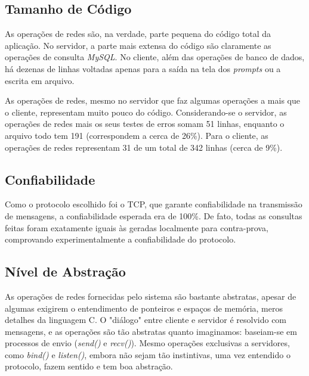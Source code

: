 \documentclass[12pt,a4paper]{article}
\begin{document}

\subsection{Tamanho de Código}
As operações de redes são, na verdade, parte pequena do código total da aplicação. No servidor, a parte mais extensa do código são claramente as operações de consulta {\it MySQL}. No cliente, além das operações de banco de dados, há dezenas de linhas voltadas apenas para a saída na tela dos {\it prompts} ou a escrita em arquivo.

As operações de redes, mesmo no servidor que faz algumas operações a mais que o cliente, representam muito pouco do código. Considerando-se o servidor, as operações de redes mais os seus testes de erros somam 51 linhas, enquanto o arquivo todo tem 191 (correspondem a cerca de 26\%). Para o cliente, as operações de redes representam 31 de um total de 342 linhas (cerca de 9\%). 

\subsection{Confiabilidade}

Como o protocolo escolhido foi o TCP, que garante confiabilidade na transmissão de mensagens, a confiabilidade esperada era de 100\%. De fato, todas as consultas feitas foram exatamente iguais às geradas localmente para contra-prova, comprovando experimentalmente a confiabilidade do protocolo.

\subsection{Nível de Abstração}

As operações de redes fornecidas pelo sistema são bastante abstratas, apesar de algumas exigirem o entendimento de ponteiros e espaços de memória, meros detalhes da linguagem C. O "diálogo" entre cliente e servidor é resolvido com mensagens, e as operações são tão abstratas quanto imaginamos: baseiam-se em processos de envio ({\it send()} e {\it recv()}). Mesmo operações exclusivas a servidores, como {\it bind()} e {\it listen()}, embora não sejam tão instintivas, uma vez entendido o protocolo, fazem sentido e tem boa abstração. 
\end{document}
